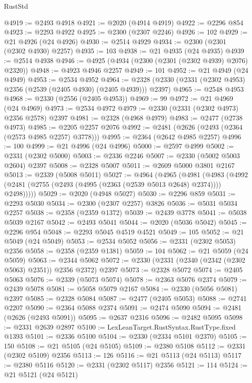 \begin{lexlean}{RustStd}
\begin{coremodule}
@4919 := @2493 @4918
@4921 := @2020 (@4914 @4919)
@4922 := @2296 @854
@4923 := @2293 @4922
@4925 := @2300 (@2307 @2246)
@4926 := 102
@4929 := @21 @4926 (@24 @4926)
@4930 := @2514 @4929
@4934 := @2300 (@2301 (@2302 @4930) @2257)
@4935 := 103
@4938 := @21 @4935 (@24 @4935)
@4939 := @2514 @4938
@4946 := @4925 (@4934 (@2300 (@2301 (@2302 @4939) @2076) @2320))
@4948 := @4923 @4946 @2257
@4949 := 101
@4952 := @21 @4949 (@24 @4949)
@4953 := @2534 @4952
@4964 := @2328 (@2330 (@2331 (@2302 @4953) @2356 (@2539 (@2405 @4930) (@2405 @4939))) @2397)
@4965 := @2548 @4953
@4968 := @2330 (@2556 (@2405 @4953))
@4969 := 99
@4972 := @21 @4969 (@24 @4969)
@4973 := @2534 @4972
@4979 := @2330 (@2331 (@2302 @4973) @2356 @2578) @2397
@4981 := @2328 (@4968 @4979)
@4983 := @2477 (@2738 @4973)
@4985 := @2205 @2257 @2076
@4992 := @2481 (@2626 (@2493 (@2364 (@2573 @4985 @2257) @3778)))
@4995 := @2364 (@2642 @4985 @2257)
@4996 := 100
@4999 := @21 @4996 (@24 @4996)
@5000 := @2597 @4999
@5002 := @2331 (@2302 @5000)
@5003 := @2336 @2246
@5007 := @2330 (@5002 @5003 @2604) @2397
@5008 := @2328 @5007
@5011 := @2609 @5000 @3801 @2167
@5013 := @2339 (@5008 @5011)
@5027 := @4964
    (@4965
      (@4981
        (@4983 (@4992 (@2481 (@2755 (@2493 (@4995 (@2363 (@2539 @5013 @2648) @2374)))) @2498)))))
@5029 := @2020 (@4948 @5027)
@5030 := @2296 @859
@5031 := @2293 @5030
@5034 := @2300 (@2307 @2257) @3826
@5036 := @5031 @5034 @2257
@5038 := @2358 (@2359 @1372)
@5039 := @2439 @3778
@5041 := @5038 @5039 @2167
@5042 := @2493 @5041
@5044 := @2020 (@5036 @5042)
@5045 := @2296 @954
@5048 := @2293 @5045 @4519 @4521
@5049 := 105
@5052 := @21 @5049 (@24 @5049)
@5053 := @2534 @5052
@5056 := @2331 (@2302 @5053) @2356
@5058 := @2358 (@2359 @1381)
@5059 := 104
@5062 := @21 @5059 (@24 @5059)
@5063 := @2344 @5062
@5072 := @2330 (@2331 (@2340 (@2342 (@2302 @5063) @2351)) @2356 @2372) @2397
@5073 := @2328 @5072
@5074 := @2405 @5063
@5076 := @2339 (@5073 @5074)
@5078 := @2363 @5076 @2374
@5079 := @2439 @5078
@5081 := @5058 @5079 @2167
@5084 := @2330 (@5056 @5081) @2397
@5085 := @2328 @5084
@5087 := @2477 (@2405 @5053)
@5088 := @2741 @2207
@5090 := @2364 @5088 @2374
@5091 := @2474 @5090
@5094 := @2481 (@2626 (@2493 @5091))
@5095 := @2637 @2316
@5096 := @2482 @5095
@5098 := @2331 @2639 @2897
@5100 := LexLeanTarget.RustSyntax.RustType.fixed @1393
@5101 := @2336 @5100
@5104 := @2330 (@2334 @5101 @2370)
@5105 := 150
@5108 := @21 @5105 (@24 @5105)
@5109 := @2380 @5108
@5112 := @2331 (@2302 @5109) @2356
@5113 := 126
@5116 := @21 @5113 (@24 @5113)
@5117 := @2380 @5116
@5120 := @2331 (@2302 @5117) @2356
@5121 := 114
@5124 := @21 @5121 (@24 @5121)

\end{coremodule}
\end{lexlean}
